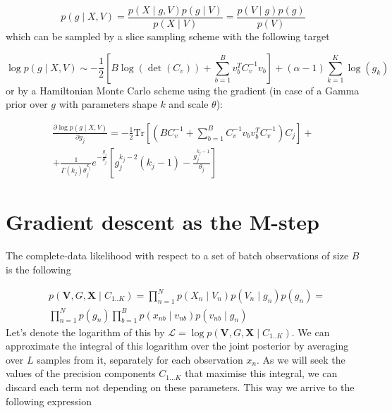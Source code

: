 \documentclass{paper}
\begin{document}
\begin{equation} 
p(g \mid X,V) = \frac{p(X \mid g,V) p(g \mid V)}{p(X \mid V)} = \frac{p(V \mid g) p(g)}{p(V)}
\end{equation}
%
which can be sampled by a  slice sampling scheme with the following target

\begin{equation} \label{eq:g_cond_logpost}
\log p(g \mid X,V) \sim -\frac{1}{2} \left[B\log(\det(C_v)) + \sum_{b=1}^B v_b^T C_v^{-1} v_b\right] + (\alpha-1) \sum_{k=1}^K \log(g_k)
\end{equation}
%
or by a Hamiltonian Monte Carlo scheme using the gradient (in case of a Gamma prior over $g$ with parameters shape $k$ and scale $\theta$):

\begin{equation}
\begin{split}
\frac{\partial \log p(g \mid X,V)}{\partial g_j} = -\frac{1}{2} \textrm{Tr} \left[ \left( B C_v^{-1} + \sum_{b=1}^B C_v^{-1} v_b v_b^T C_v^{-1} \right) C_j \right] + \\
+ \frac{1}{\Gamma(k_j) \theta_j^{k_j}} e^{-\frac{g_j}{\theta_j}} \left[ g_j^{k_j-2} (k_j -1) - \frac{g_j^{k_j-1}}{\theta_j} \right]
\end{split}
\end{equation}


\section{Gradient descent as the M-step}

The complete-data likelihood with respect to a set of batch observations of size $B$ is the following

\begin{equation}
\begin{split}
&p(\mathbf{V},G,\mathbf{X} \mid C_{1..K}) = \prod_{n=1}^N p(X_n \mid V_n) p(V_n \mid g_n) p(g_n) = \\
&\prod_{n=1}^N p(g_n) \prod_{b=1}^B p(x_{nb} \mid v_{nb}) p(v_{nb} \mid g_n) 
\end{split}
\end{equation}
%
Let's denote the logarithm of this by $\mathcal{L}=\log p(\mathbf{V},G,\mathbf{X} \mid C_{1..K})$. We can approximate the integral of this logarithm over the joint posterior by averaging over $L$ samples from it, separately for each observation $x_n$. As we will seek the values of the precision components $C_{1 \dots K}$ that maximise this integral, we can discard each term not depending on these parameters. This way we arrive to the following expression 
\end{document}
